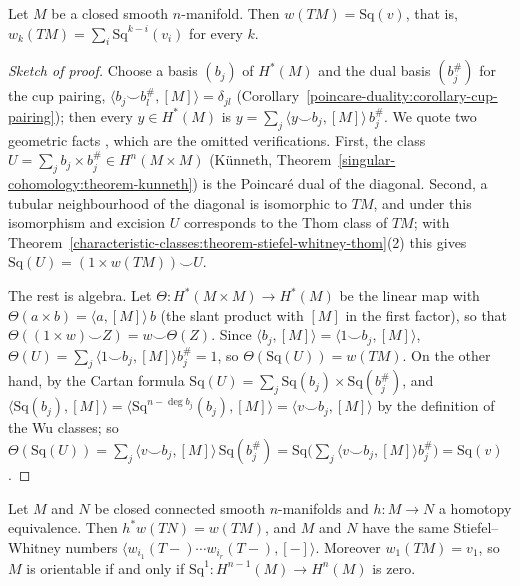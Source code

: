 \begin{theorem}[Wu's formula]\label{characteristic-classes:theorem-wu}
Let $M$ be a closed smooth $n$-manifold. Then $w(TM) = \mathrm{Sq}(v)$, that is, $w_k(TM) = \sum_i\mathrm{Sq}^{k-i}(v_i)$ for every $k$.
\end{theorem}

\begin{proof}[Sketch of proof]
Choose a basis $(b_j)$ of $H^*(M)$ and the dual basis $(b_j^\#)$ for the cup pairing, $\langle b_j \smile b_l^\#, [M]\rangle = \delta_{jl}$
(Corollary~\ref{poincare-duality:corollary-cup-pairing}); then every $y \in H^*(M)$ is $y = \sum_j\langle y \smile b_j, [M]\rangle\,b_j^\#$. We quote two
geometric facts \cite[Chapter 11]{milnor-stasheff}, which are the omitted verifications. First, the class $U = \sum_jb_j \times b_j^\# \in H^n(M \times M)$
(K\"unneth, Theorem~\ref{singular-cohomology:theorem-kunneth}) is the Poincar\'e dual of the diagonal. Second, a tubular neighbourhood of the diagonal is
isomorphic to $TM$, and under this isomorphism and excision $U$ corresponds to the Thom class of $TM$; with
Theorem~\ref{characteristic-classes:theorem-stiefel-whitney-thom}(2) this gives $\mathrm{Sq}(U) = (1 \times w(TM)) \smile U$.

The rest is algebra. Let $\Theta \colon H^*(M \times M) \to H^*(M)$ be the linear map with $\Theta(a \times b) = \langle a, [M]\rangle\,b$ (the slant
product with $[M]$ in the first factor), so that $\Theta((1 \times w) \smile Z) = w \smile \Theta(Z)$. Since $\langle b_j, [M]\rangle = \langle 1 \smile b_j, [M]\rangle$,
$\Theta(U) = \sum_j\langle 1 \smile b_j, [M]\rangle b_j^\# = 1$, so $\Theta(\mathrm{Sq}(U)) = w(TM)$. On the other hand, by the Cartan formula
$\mathrm{Sq}(U) = \sum_j\mathrm{Sq}(b_j) \times \mathrm{Sq}(b_j^\#)$, and $\langle\mathrm{Sq}(b_j), [M]\rangle = \langle\mathrm{Sq}^{n - \deg b_j}(b_j), [M]\rangle
= \langle v \smile b_j, [M]\rangle$ by the definition of the Wu classes; so
$\Theta(\mathrm{Sq}(U)) = \sum_j\langle v \smile b_j, [M]\rangle\,\mathrm{Sq}(b_j^\#) = \mathrm{Sq}\bigl(\sum_j\langle v \smile b_j, [M]\rangle b_j^\#\bigr) = \mathrm{Sq}(v)$.
\end{proof}

\begin{corollary}\label{characteristic-classes:corollary-wu-invariance}
Let $M$ and $N$ be closed connected smooth $n$-manifolds and $h \colon M \to N$ a homotopy equivalence. Then $h^*w(TN) = w(TM)$, and $M$ and $N$
have the same Stiefel--Whitney numbers $\langle w_{i_1}(T-) \cdots w_{i_r}(T-), [-]\rangle$. Moreover $w_1(TM) = v_1$, so $M$ is orientable if and only if
$\mathrm{Sq}^1 \colon H^{n-1}(M) \to H^n(M)$ is zero.
\end{corollary}

